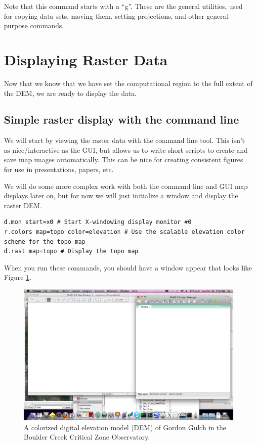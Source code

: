 \documentclass{book}
\begin{document}
Note that this command starts with a ``g''. These are the general utilities, used for copying data sets, moving them, setting projections, and other general-purpose commands.


\section{Displaying Raster Data}

Now that we know that we have set the computational region to the full extent of the DEM, we are ready to display the data.

\subsection{Simple raster display with the command line}

We will start by viewing the raster data with the command line tool. This isn't as nice/interactive as the GUI, but allows us to write short scripts to create and save map images automatically. This can be nice for creating consistent figures for use in presentations, papers, etc.

We will do some more complex work with both the command line and GUI map displays later on, but for now we will just initialize a window and display the raster DEM.
\begin{lstlisting}
d.mon start=x0 # Start X-windowing display monitor #0
r.colors map=topo color=elevation # Use the scalable elevation color scheme for the topo map
d.rast map=topo # Display the topo map
\end{lstlisting}
When you run these commands, you should have a window appear that looks like Figure \ref{fig:DEMfig}.

\begin{figure}[h]
 \begin{center}
 \includegraphics[width=.9\linewidth]{figures/mac/DEMfig.png}
 \caption{A colorized digital elevation model (DEM) of Gordon Gulch in the Boulder Creek Critical Zone Observatory.}
 \label{fig:DEMfig}
 \end{center}
\end{figure}
\end{document}
